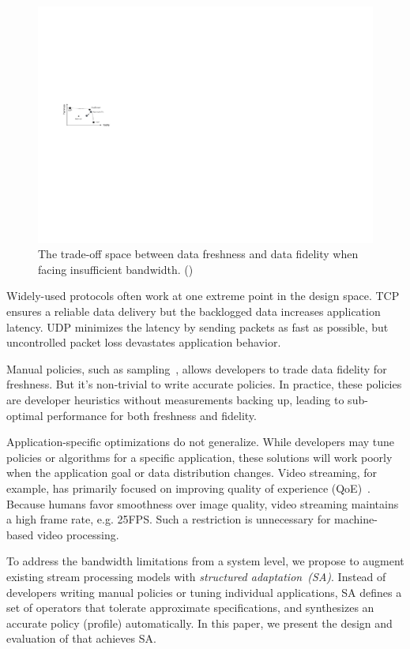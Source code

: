\begin{figure}
  \centering
  \includegraphics[width=0.9\linewidth]{figures/intro.pdf}
  \caption{The trade-off space between data freshness and data fidelity when
    facing insufficient bandwidth. ()}
  \label{fig:intro}
  \vspace{-1em}
\end{figure}

Widely-used protocols often work at one extreme point in the design space. TCP
ensures a reliable data delivery but the backlogged data increases application
latency. UDP minimizes the latency by sending packets as fast as possible, but
uncontrolled packet loss devastates application behavior.

Manual policies, such as sampling~\cite{rabkin2014aggregation}, allows
developers to trade data fidelity for freshness. But it's non-trivial to write
accurate policies. In practice, these policies are developer heuristics without
measurements backing up, leading to sub-optimal performance for both freshness
and fidelity.

Application-specific optimizations do not generalize. While developers may tune
policies or algorithms for a specific application, these solutions will work
poorly when the application goal or data distribution changes. Video streaming,
for example, has primarily focused on improving quality of experience
(QoE)~\cite{yin2015control}. Because humans favor smoothness over image quality,
video streaming maintains a high frame rate, e.g. 25FPS. Such a restriction is
unnecessary for machine-based video processing.

To address the bandwidth limitations from a system level, we propose to augment
existing stream processing models with \textit{structured
  adaptation~(SA)}. Instead of developers writing manual policies or tuning
individual applications, SA defines a set of operators that tolerate approximate
specifications, and synthesizes an accurate policy (profile) automatically. In
this paper, we present the design and evaluation of \sysname{} that achieves SA.

